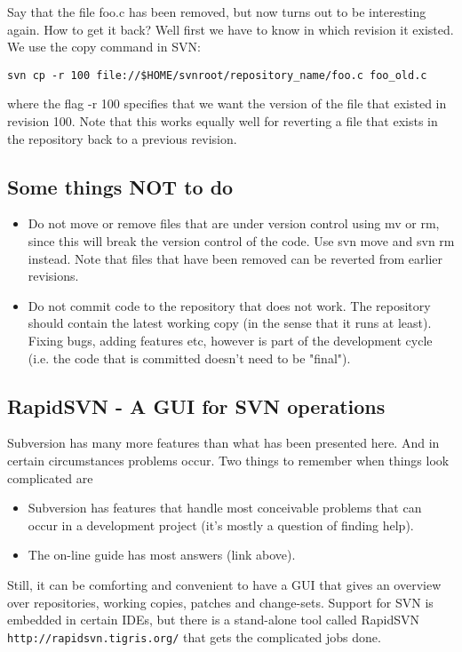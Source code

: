\documentclass{article}
\begin{document}
Say that the file foo.c has been removed, but now turns out to be
interesting again. How to get it back? Well first we have to know in
which revision it existed. We use the copy command in SVN: 
\begin{verbatim}
svn cp -r 100 file://$HOME/svnroot/repository_name/foo.c foo_old.c
\end{verbatim}
where the flag -r 100 specifies that we want the version of the file
that existed in revision 100. Note that this works equally well for
reverting a file that exists in the repository back to a previous
revision.  
\subsection{Some things NOT to do}
\begin{itemize}
    \item Do not move or remove files that are under version control
    using mv or rm, since this will break the version control of the
    code. Use svn move and svn rm instead. Note that files that have
    been removed can be reverted from earlier revisions. 
    \item Do not commit code to the repository that does not work. The
    repository should contain the latest working copy (in the sense
    that it runs at least). Fixing bugs, adding features etc, however
    is part of the development cycle (i.e. the code that is committed
    doesn't need to be "final").  
\end{itemize}
\subsection{RapidSVN - A GUI for SVN operations}
Subversion has many more features than what has been presented
here. And in certain circumstances problems occur. Two things to
remember when things look complicated are 
\begin{itemize}
\item Subversion has features that handle most conceivable problems that can occur in a development project (it's mostly a question of finding help).
\item The on-line guide has most answers (link above). 
\end{itemize}
Still, it can be comforting and convenient to have a GUI that gives an
overview over repositories, working copies, patches and
change-sets. Support for SVN is embedded in certain IDEs, but there is
a stand-alone tool called RapidSVN \verb+http://rapidsvn.tigris.org/+
that gets the complicated jobs done. 
\end{document}
